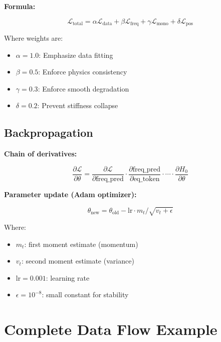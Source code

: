 \documentclass[11pt,a4paper]{article}
\begin{document}
\textbf{Formula:}

\begin{equation}
\mathcal{L}_{\text{total}} = \alpha \mathcal{L}_{\text{data}} + \beta \mathcal{L}_{\text{freq}} + \gamma \mathcal{L}_{\text{mono}} + \delta \mathcal{L}_{\text{pos}}
\end{equation}

Where weights are:
\begin{itemize}
  \item $\alpha = 1.0$: Emphasize data fitting
  \item $\beta = 0.5$: Enforce physics consistency
  \item $\gamma = 0.3$: Enforce smooth degradation
  \item $\delta = 0.2$: Prevent stiffness collapse
\end{itemize}

\subsection{Backpropagation}

\textbf{Chain of derivatives:}

\begin{equation}
\frac{\partial \mathcal{L}}{\partial \theta} = \frac{\partial \mathcal{L}}{\partial \text{freq\_pred}} \cdot \frac{\partial \text{freq\_pred}}{\partial \text{eq\_token}} \cdot \cdots \cdot \frac{\partial H_0}{\partial \theta}
\end{equation}

\textbf{Parameter update (Adam optimizer):}

\begin{equation}
\theta_{\text{new}} = \theta_{\text{old}} - \text{lr} \cdot m_t / \sqrt{v_t + \epsilon}
\end{equation}

Where:
\begin{itemize}
  \item $m_t$: first moment estimate (momentum)
  \item $v_t$: second moment estimate (variance)
  \item $\text{lr} = 0.001$: learning rate
  \item $\epsilon = 10^{-8}$: small constant for stability
\end{itemize}

\section{Complete Data Flow Example}
\end{document}
